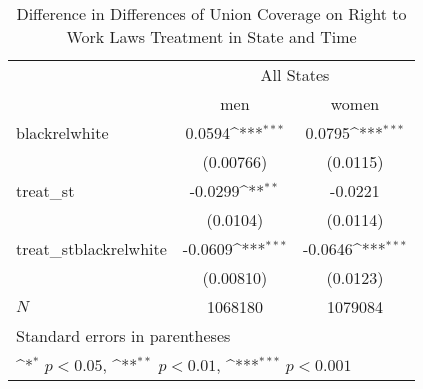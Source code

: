 \begin{table}[htbp]\centering
\def\sym#1{\ifmmode^{#1}\else\(^{#1}\)\fi}
\caption{Difference in Differences of Union Coverage on Right to Work Laws Treatment in State and Time}
\begin{tabular}{l*{2}{c}}
\hline\hline
            &\multicolumn{2}{c}{All States}             \\\cmidrule(lr){2-3}
            &\multicolumn{1}{c}{men}&\multicolumn{1}{c}{women}\\
\hline
blackrelwhite&      0.0594\sym{***}&      0.0795\sym{***}\\
            &   (0.00766)         &    (0.0115)         \\
[1em]
treat\_st    &     -0.0299\sym{**} &     -0.0221         \\
            &    (0.0104)         &    (0.0114)         \\
[1em]
treat\_stblackrelwhite&     -0.0609\sym{***}&     -0.0646\sym{***}\\
            &   (0.00810)         &    (0.0123)         \\
\hline
\(N\)       &     1068180         &     1079084         \\
\hline\hline
\multicolumn{3}{l}{\footnotesize Standard errors in parentheses}\\
\multicolumn{3}{l}{\footnotesize \sym{*} \(p<0.05\), \sym{**} \(p<0.01\), \sym{***} \(p<0.001\)}\\
\end{tabular}
\end{table}

